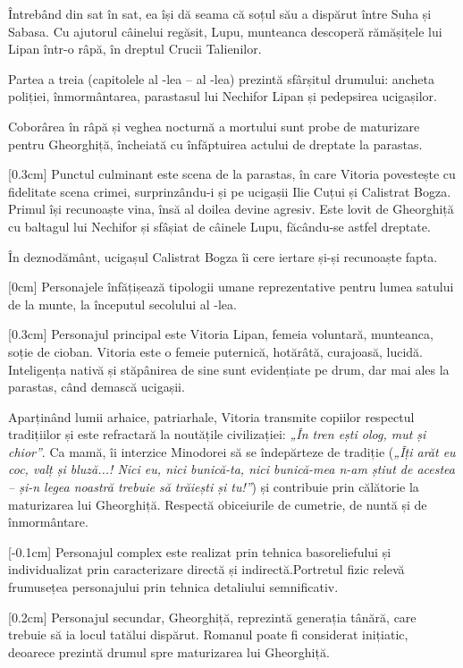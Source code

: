 Întrebând din sat în sat, ea își dă seama că soțul său a dispărut între Suha și Sabasa. Cu ajutorul câinelui regăsit, Lupu, munteanca descoperă rămășițele lui Lipan într-o râpă, în dreptul Crucii Talienilor.

Partea a treia (capitolele al -lea -- al -lea) prezintă sfârșitul drumului: ancheta poliției, înmormântarea, parastasul lui Nechifor Lipan și pedepsirea ucigașilor.

Coborârea în râpă și veghea nocturnă a mortului sunt probe de maturizare pentru Gheorghiță, încheiată cu înfăptuirea actului de dreptate la parastas.

[0.3cm]
Punctul culminant este scena de la parastas, în care Vitoria povestește cu fidelitate scena crimei, surprinzându-i și pe ucigașii Ilie Cuțui și Calistrat Bogza. Primul își recunoaște vina, însă al doilea devine agresiv. Este lovit de Gheorghiță cu baltagul lui Nechifor și sfâșiat de câinele Lupu, făcându-se astfel dreptate.

În deznodământ, ucigașul Calistrat Bogza îi cere iertare și-și recunoaște fapta.

[0cm]
Personajele înfățișează tipologii umane reprezentative pentru lumea satului de la munte, la începutul secolului al -lea.

[0.3cm]
Personajul principal este Vitoria Lipan, femeia voluntară, munteanca, soție de cioban. Vitoria este o femeie puternică, hotărâtă, curajoasă, lucidă. Inteligența nativă și stăpânirea de sine sunt evidențiate pe drum, dar mai ales la parastas, când demască ucigașii.

Aparținând lumii arhaice, patriarhale, Vitoria transmite copiilor respectul tradițiilor și este refractară la noutățile civilizației: \textit{„În tren ești olog, mut și chior”}. Ca mamă, îi interzice Minodorei să se îndepărteze de tradiție (\textit{„Îți arăt eu coc, valț și bluză...! Nici eu, nici bunică-ta, nici bunică-mea n-am știut de acestea -- și-n legea noastră trebuie să trăiești și tu!”}) și contribuie prin călătorie la maturizarea lui Gheorghiță. Respectă obiceiurile de cumetrie, de nuntă și de înmormântare.

[-0.1cm]
Personajul complex este realizat prin tehnica basoreliefului și individualizat prin caracterizare directă și indirectă.Portretul fizic relevă frumusețea personajului prin tehnica detaliului semnificativ.

[0.2cm]
Personajul secundar, Gheorghiță, reprezintă generația tânără, care trebuie să ia locul tatălui dispărut. Romanul poate fi considerat inițiatic, deoarece prezintă drumul spre maturizarea lui Gheorghiță.

